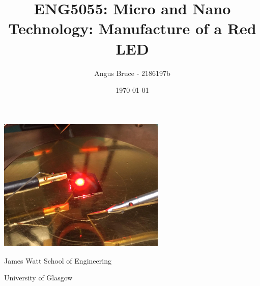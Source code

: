 \documentclass[a4paper]{article}
\title{ENG5055: Micro and Nano Technology: Manufacture of a Red LED}
\author{Angus Bruce - 2186197b}\date{\today}
\begin{document}
  \pagestyle{empty}
  \clearpage
  \pagestyle{empty}
  \maketitle
  \pagestyle{empty}
  \begin{center}
    \vspace{0.8cm}
    \includegraphics[width=8cm]{Figures/LED_on_picture.jpeg}
    \vspace{0.8cm}

    James Watt School of Engineering

    University of Glasgow
  \end{center}


  \thispagestyle{empty}






  \newpage
  \pagestyle{plain}

  

  

  

  

  
\end{document}

